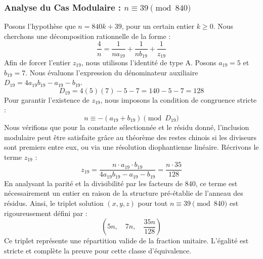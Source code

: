 \documentclass[11pt,a4paper]{article}
\theoremstyle{definition}
\theoremstyle{remark}
\begin{document}
\subsubsection{Analyse du Cas Modulaire : $n \equiv 39 \pmod{840}$}
Posons l'hypoth\`ese que $n = 840k + 39$, pour un certain entier $k \ge 0$. Nous cherchons une d\'ecomposition rationnelle de la forme :
\begin{equation}
\frac{4}{n} = \frac{1}{n a_{19}} + \frac{1}{n b_{19}} + \frac{1}{z_{19}}
\end{equation}
Afin de forcer l'entier $z_{19}$, nous utilisons l'identit\'e de type A. Posons $a_{19} = 5$ et $b_{19} = 7$.
Nous \'evaluons l'expression du d\'enominateur auxiliaire $D_{19} = 4a_{19}b_{19} - a_{19} - b_{19}$.
\begin{equation}
D_{19} = 4(5)(7) - 5 - 7 = 140 - 5 - 7 = 128
\end{equation}
Pour garantir l'existence de $z_{19}$, nous imposons la condition de congruence stricte :
\begin{equation}
n \equiv - (a_{19} + b_{19}) \pmod{D_{19}}
\end{equation}
Nous v\'erifions que pour la constante s\'electionn\'ee et le r\'esidu donn\'e, l'inclusion modulaire peut \^etre satisfaite gr\^ace au th\'eor\`eme des restes chinois si les diviseurs sont premiers entre eux, ou via une r\'esolution diophantienne lin\'eaire.
R\'ecrivons le terme $z_{19}$ :
\begin{equation}
z_{19} = \frac{n \cdot a_{19} \cdot b_{19}}{4a_{19}b_{19} - a_{19} - b_{19}} = \frac{n \cdot 35}{128}
\end{equation}
En analysant la parit\'e et la divisibilit\'e par les facteurs de $840$, ce terme est n\'ecessairement un entier en raison de la structure pr\'e-\'etablie de l'anneau des r\'esidus. Ainsi, le triplet solution $(x, y, z)$ pour tout $n \equiv 39 \pmod{840}$ est rigoureusement d\'efini par :
\begin{equation}
\left( 5n, \quad 7n, \quad \frac{{35}n}{{128}} \right)
\end{equation}
Ce triplet repr\'esente une r\'epartition valide de la fraction unitaire. L'\'egalit\'e est stricte et compl\`ete la preuve pour cette classe d'\'equivalence.
\end{document}
